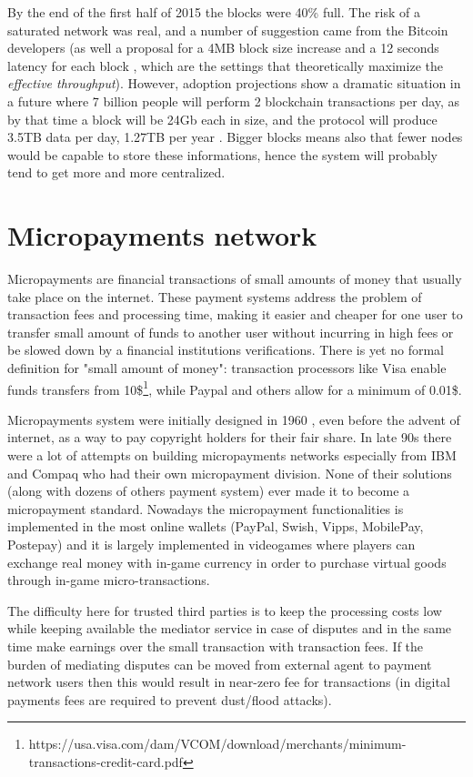 		By the end of the first half of 2015 the blocks were 40\% full. The risk of a saturated network was real, and a number of suggestion came from the Bitcoin developers (as well a proposal for a 4MB block size increase and a 12 seconds latency for each block \cite{Croman}, which are the settings that theoretically maximize the \textit{effective throughput}). However, adoption projections show a dramatic situation in a future where 7 billion people will perform 2 blockchain transactions per day, as by that time a block will be 24Gb each in size, and the protocol will produce 3.5TB data per day, 1.27TB per year \cite{SFBitcoinDevs2015}. Bigger blocks means also that fewer nodes would be capable to store these informations, hence the system will probably tend to get more and more centralized.
		
		\section{Micropayments network}
		
		Micropayments are financial transactions of small amounts of money that usually take place on the internet. These payment systems address the problem of transaction fees and processing time, making it easier and cheaper for one user to transfer small amount of funds to another user without incurring in high fees or be slowed down by a financial institutions verifications. There is yet no formal definition for "small amount of money": transaction processors like Visa enable funds transfers from 10\$\footnote{https://usa.visa.com/dam/VCOM/download/merchants/minimum-transactions-credit-card.pdf}, while Paypal and others allow for a minimum of 0.01\$. 
		
		Micropayments system were initially designed in 1960 \cite{Nelson1960}, even before the advent of internet, as a way to pay copyright holders for their fair share. In late 90s there were a lot of attempts on building micropayments networks especially from IBM and Compaq who had their own micropayment division. None of their solutions (along with dozens of others payment system) ever made it to become a micropayment standard. Nowadays the micropayment functionalities is implemented in the most online wallets (PayPal, Swish, Vipps, MobilePay, Postepay) and it is largely implemented in videogames where players can exchange real money with in-game currency in order to purchase virtual goods through in-game micro-transactions. 
		
		The difficulty here for trusted third parties is to keep the processing costs low while keeping available the mediator service in case of disputes and in the same time make earnings over the small transaction with transaction fees. If the burden of mediating disputes can be moved from external agent to payment network users then this would result in near-zero fee for transactions (in digital payments fees are required to prevent dust/flood attacks).
		
